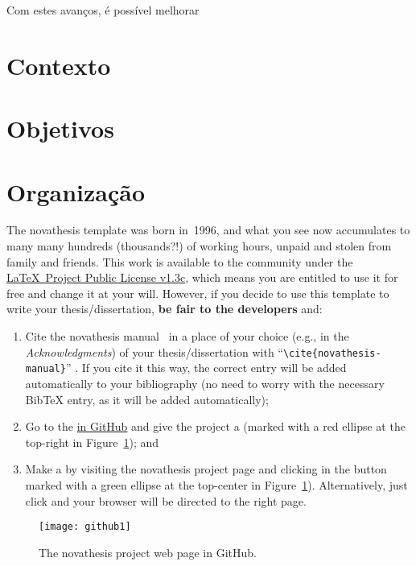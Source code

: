 Com estes avanços, é possível melhorar

\section{Contexto}
\label{sec:context}

\section{Objetivos}
\label{sec:objetivos}

\section{Organização}
\label{sec:organization}

The \gls{novathesis} template was born in~1996, and what you see now accumulates to many many hundreds (thousands?!) of working hours, unpaid and stolen from family and friends.  This work is available to the community under the \href{LaTeX project public license}{\LaTeX\ Project Public License v1.3c}, which means you are entitled to use it for free and change it at your will.  However, if you decide to use this template to write your thesis/dissertation, \textbf{be fair to the developers} and:
\begin{enumerate}
  \item {} Cite the \gls{novathesis} manual~\cite{novathesis-manual} in a place of your choice (e.g., in the \emph{Acknowledgments}) of your thesis/dissertation with “\verb!\cite{novathesis-manual}!” .  If you cite it this way, the correct entry will be added automatically to your bibliography (no need to worry with the necessary BibTeX entry, as it will be added automatically);
  \item Go to the
\href{https://github.com/joaomlourenco/novathesis}{ in GitHub} and give the project a  (marked with a red ellipse at the top-right in Figure~\ref{fig:github}); and
  \item Make a  by visiting the \gls{novathesis} project page and clicking in the button marked with a green ellipse at the top-center in Figure~\ref{fig:github}).  Alternatively, just click \href{https://www.paypal.com/donate/?hosted_button_id=8WA8FRVMB78W8}{} and your browser will be directed to the right page.
\end{enumerate}

\begin{figure}[htbp]
    \centering
    \texttt{[image: github1]}
    \caption{The \gls{novathesis} project web page in GitHub.}
    \label{fig:github}
\end{figure}